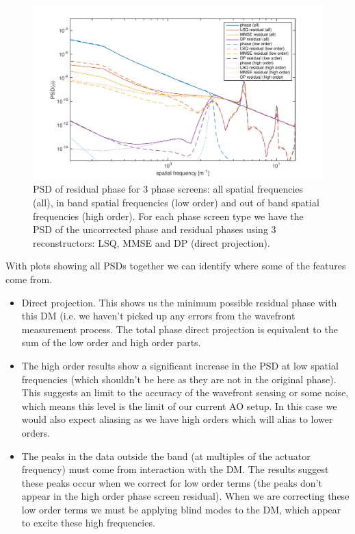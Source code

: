 \documentclass[pdf]{note}
\begin{document}
\begin{figure}[htdp]
    \centerline{
      \includegraphics[scale=0.7]{plots/residual_PSDs}
    }
    \caption{PSD of residual phase for 3 phase screens: all spatial frequencies (all), in band spatial frequencies
    		(low order) and out of band spatial frequencies (high order).  For each phase screen type we have the
		PSD of the uncorrected phase and residual phases using 3 reconstructors: LSQ, MMSE and DP (direct projection).
    }
    \label{fig:res_PSDs}
\end{figure}

With plots showing all PSDs together we can identify where some of the features come from.

\begin{itemize}
\item Direct projection.  This shows us the minimum possible residual phase with this DM (i.e. we haven't
picked up any errors from the wavefront measurement process.  The total phase direct projection
is equivalent to the sum of the low order and high order parts.
\item The high order results show a significant increase in the PSD at low spatial frequencies (which shouldn't
be here as they are not in the original phase).  This suggests an limit to the accuracy of the wavefront
sensing or some noise, which means this level is the limit of our current AO setup.  In this case we would also
expect aliasing as we have high orders which will alias to lower orders.
\item The peaks in the data outside the band (at multiples of the actuator frequency) must come from
interaction with the DM.  The results suggest these peaks occur when we correct for low order terms (the
peaks don't appear in the high order phase screen residual).  When we are correcting these low order terms
we must be applying blind modes to the DM, which appear to excite these high frequencies.  
\end{itemize}
\end{document}
